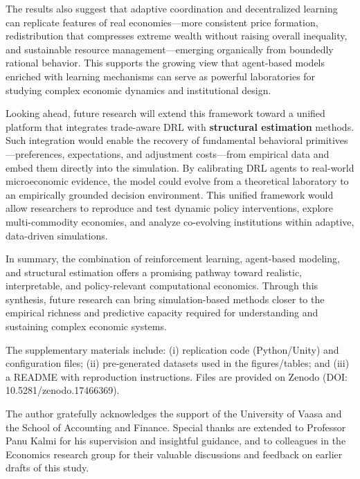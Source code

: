 \documentclass[pdflatex,sn-mathphys-num]{sn-jnl}%
\theoremstyle{thmstyleone}%
\theoremstyle{thmstyletwo}%
\theoremstyle{thmstylethree}%
\begin{document}
The results also suggest that adaptive coordination and decentralized learning can replicate features of real economies---more consistent price formation, redistribution that compresses extreme wealth without raising overall inequality, and sustainable resource management---emerging organically from boundedly rational behavior.  
This supports the growing view that agent-based models enriched with learning mechanisms can serve as powerful laboratories for studying complex economic dynamics and institutional design.

Looking ahead, future research will extend this framework toward a unified platform that integrates trade-aware DRL with \textbf{structural estimation} methods.  
Such integration would enable the recovery of fundamental behavioral primitives---preferences, expectations, and adjustment costs---from empirical data and embed them directly into the simulation.  
By calibrating DRL agents to real-world microeconomic evidence, the model could evolve from a theoretical laboratory to an empirically grounded decision environment.  
This unified framework would allow researchers to reproduce and test dynamic policy interventions, explore multi-commodity economies, and analyze co-evolving institutions within adaptive, data-driven simulations.

In summary, the combination of reinforcement learning, agent-based modeling, and structural estimation offers a promising pathway toward realistic, interpretable, and policy-relevant computational economics.  
Through this synthesis, future research can bring simulation-based methods closer to the empirical richness and predictive capacity required for understanding and sustaining complex economic systems.

\backmatter


The supplementary materials include: (i) replication code (Python/Unity) and
configuration files; (ii) pre-generated datasets used in the figures/tables; and (iii) a README with reproduction instructions. Files are provided on Zenodo (DOI: 10.5281/zenodo.17466369).


The author gratefully acknowledges the support of the University of Vaasa and the School of Accounting and Finance. 
Special thanks are extended to Professor Panu Kalmi for his supervision and insightful guidance, and to colleagues in the Economics research group for their valuable discussions and feedback on earlier drafts of this study.
\end{document}

